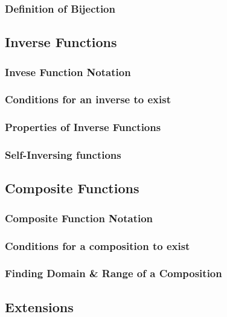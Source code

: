 \documentclass[../main.tex]{subfiles}
\begin{document}
\subsubsection{Definition of Bijection}

\subsection{Inverse Functions}

\subsubsection{Invese Function Notation}

\subsubsection{Conditions for an inverse to exist}

\subsubsection{Properties of Inverse Functions}

\subsubsection{Self-Inversing functions}

\subsection{Composite Functions}

\subsubsection{Composite Function Notation}

\subsubsection{Conditions for a composition to exist}

\subsubsection{Finding Domain \& Range of a Composition}

\subsection{Extensions}
\end{document}
